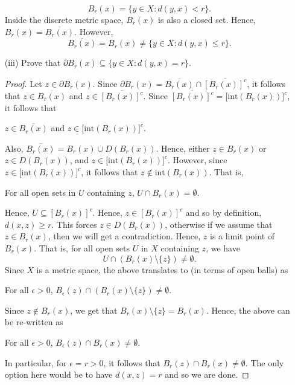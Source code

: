 \documentclass[a4paper]{article}
\begin{document}
\begin{problem}
\begin{enumerate}
\begin{solution}
            \[  {B}_{r}(x) = \{  y \in X : d(y,x) < r  \}.  \]
            Inside the discrete metric space, \( {B}_{r}(x) \) is also a closed set. Hence, \( {B}_{r}(x) = \overline{{B}_{r}(x)} \). However,
            \[  \overline{{B}_{r}(x)} = {B}_{r}(x) \neq \{ y \in X : d(y,x) \leq r  \}. \]
            \end{solution}
\item[(iii)] Prove that \( \partial {B}_{r}(x) \subseteq \{ y \in X : d(y,x) = r  \}.  \)
    \begin{proof}
        Let \( z \in \partial {B}_{r}(x) \). Since \( \partial {B}_{r}(x) = \overline{{B}_{r}(x)} \cap \overline{[{B}_{r}(x)]^{c}} \), it follows that \( z \in \overline{{B}_{r}(x)} \) and \( z \in \overline{[{B}_{r}(x)]^{c}} \). Since \( \overline{[{B}_{r}(x)]^{c}} = \big[\text{int}({B}_{r}(x))\big]^{c} \), it follows that 
        \begin{center}
            \( z \in \overline{{B}_{r}(x)}  \) and \( z \in \big[\text{int}({B}_{r}(x))\big]^{c} \).
        \end{center}
        Also, \( \overline{{B}_{r}(x)} = {B}_{r}(x) \cup D({B}_{r}(x)) \). Hence, either \( z \in {B}_{r}(x) \) or \( z \in D({B}_{r}(x)) \), and \( z \in \big[\text{int}({B}_{r}(x))\big]^{c} \). However, since \( z \in \big[ \text{int}({B}_{r}(x))\big]^{c} \), it follows that \(z \notin \text{int}({B}_{r}(x)) \). That is,\begin{center}
             For all open sets in \( U  \) containing \( z  \), \( U \cap {B}_{r}(x) = \emptyset \). 
        \end{center}
        Hence, \( U \subseteq [{B}_{r}(x)]^{c} \). Hence, \( z \in [{B}_{r}(x)]^{c} \) and so by definition, \( d(x,z) \geq r  \). This forces \( z \in D({B}_{r}(x)) \), otherwise if we assume that \( z \in {B}_{r}(x) \), then we will get a contradiction. Hence, \( z  \) is a limit point of \( {B}_{r}(x) \). That is, for all open sets \( U  \) in \( X  \) containing \( z  \), we have     
        \[  U \cap ({B}_{r}(x) \setminus  \{ z \} ) \neq \emptyset. \]
        Since \( X  \) is a metric space, the above translates to (in terms of open balls) as 
        \begin{center}
            For all \( \epsilon > 0  \), \( {B}_{\epsilon}(z) \cap ({B}_{r}(x) \setminus \{ z \} ) \neq \emptyset \).
        \end{center}
        Since \( z \notin {B}_{r}(x)  \), we get that \( {B}_{r}(x) \setminus  \{ z  \}  = {B}_{r}(x) \). Hence, the above can be re-written as
        \begin{center}
            For all \( \epsilon > 0  \), \( {B}_{\epsilon}(z) \cap {B}_{r}(x) \neq \emptyset \).
        \end{center}
        In particular, for \( \epsilon = r > 0  \), it follows that \( {B}_{r}(z) \cap {B}_{r}(x) \neq \emptyset  \). The only option here would be to have \( d(x,z) = r  \) and so we are done. 


\end{proof}
\end{enumerate}
\end{problem}
\end{document}
